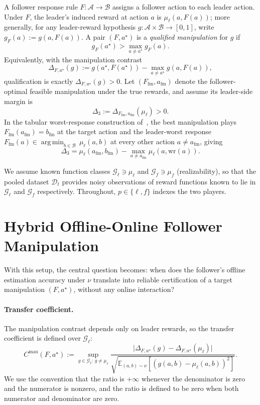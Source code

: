 \documentclass{article}
\newcommand{\cA}{\mathcal{A}}
\newcommand{\cB}{\mathcal{B}}
\newcommand{\cG}{\mathcal{G}}
\newcommand{\cD}{\mathcal{D}}
\newcommand{\E}{\mathbb{E}}           %
\newcommand{\argmin}{\operatorname*{arg\,min}}
\begin{document}
A follower response rule $F:\cA\to\cB$ assigns a follower action to each leader action. Under $F$, the leader's induced reward at action $a$ is $\mu_\ell(a,F(a))$; more generally, for any leader-reward hypothesis $g:\cA\times\cB\to[0,1]$, write $g_F(a):=g(a,F(a))$. A pair $(F,a^\star)$ is a \emph{qualified manipulation} for $g$ if
\begin{equation}
    g_F(a^\star)>\max_{a\neq a^\star}g_F(a).
    \label{eq:qualified-manip-fclass}
\end{equation}
Equivalently, with the manipulation contrast
\begin{equation}
    \Delta_{F,a^\star}(g):=g(a^\star,F(a^\star))-\max_{a\neq a^\star}g(a,F(a)),
    \label{eq:contrast-functional-fclass}
\end{equation}
qualification is exactly $\Delta_{F,a^\star}(g)>0$. Let $(F_{\mathrm{fm}},a_{\mathrm{fm}})$ denote the follower-optimal feasible manipulation under the true rewards, and assume its leader-side margin is
\[
    \Delta_3:=\Delta_{F_{\mathrm{fm}},a_{\mathrm{fm}}}(\mu_\ell)>0.
\]
In the tabular worst-response construction of~\cite{yu2024decentralized}, the best manipulation plays $F_{\mathrm{fm}}(a_{\mathrm{fm}})=b_{\mathrm{fm}}$ at the target action and the leader-worst response $F_{\mathrm{fm}}(a)\in\argmin_{b\in\cB}\,\mu_\ell(a,b)$ at every other action $a\neq a_{\mathrm{fm}}$, giving
\[
    \Delta_3=\mu_\ell(a_{\mathrm{fm}},b_{\mathrm{fm}})-\max_{a\neq a_{\mathrm{fm}}}\mu_\ell(a,\mathrm{wr}(a)).
\]

We assume known function classes $\cG_\ell\ni\mu_\ell$ and $\cG_f\ni\mu_f$ (realizability), so that the pooled dataset $\cD_t$ provides noisy observations of reward functions known to lie in $\cG_\ell$ and $\cG_f$ respectively. Throughout, $p\in\{\ell,f\}$ indexes the two players.

\section{Hybrid Offline-Online Follower Manipulation}
\label{sec:hybrid-fmucb}
With this setup, the central question becomes: when does the follower's offline estimation accuracy under $\nu$ translate into reliable certification of a target manipulation $(F,a^\star)$, without any online interaction?

\paragraph{Transfer coefficient.}
The manipulation contrast depends only on leader rewards, so the transfer coefficient is defined over $\cG_\ell$:
\begin{equation}
C^{\mathrm{man}}(F,a^\star):=
\sup_{g\in\cG_\ell:\,g\neq\mu_\ell}
\frac{
\bigl|\Delta_{F,a^\star}(g)-\Delta_{F,a^\star}(\mu_\ell)\bigr|
}{
\sqrt{\E_{(a,b)\sim\nu}[(g(a,b)-\mu_\ell(a,b))^2]}}
.
\label{eq:Cman-fclass}
\end{equation}
We use the convention that the ratio is $+\infty$ whenever the denominator is zero and the numerator is nonzero, and the ratio is defined to be zero when both numerator and denominator are zero.
\end{document}
